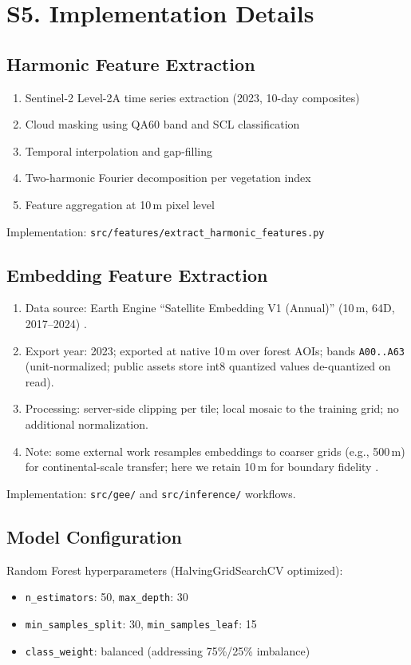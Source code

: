 \documentclass[utf8]{frontiers_suppmat}
\begin{document}
\section{S5. Implementation Details}

\subsection{Harmonic Feature Extraction}
\begin{enumerate}
    \item Sentinel-2 Level-2A time series extraction (2023, 10-day composites)
    \item Cloud masking using QA60 band and SCL classification
    \item Temporal interpolation and gap-filling
    \item Two-harmonic Fourier decomposition per vegetation index
    \item Feature aggregation at 10\,m pixel level
\end{enumerate}
Implementation: \texttt{src/features/extract\_harmonic\_features.py}

\subsection{Embedding Feature Extraction}
\begin{enumerate}
  \item Data source: Earth Engine “Satellite Embedding V1 (Annual)” (10\,m, 64D, 2017–2024) \citep{Google2025SatelliteEmbeddingV1}.
  \item Export year: 2023; exported at native 10\,m over forest AOIs; bands \texttt{A00..A63} (unit-normalized; public assets store int8 quantized values de-quantized on read).
  \item Processing: server-side clipping per tile; local mosaic to the training grid; no additional normalization.
  \item Note: some external work resamples embeddings to coarser grids (e.g., 500\,m) for continental-scale transfer; here we retain 10\,m for boundary fidelity \citep{Houriez2025AEFDataGen}.
\end{enumerate}
Implementation: \texttt{src/gee/} and \texttt{src/inference/} workflows.

\subsection{Model Configuration}
Random Forest hyperparameters (HalvingGridSearchCV optimized):
\begin{itemize}
    \item \texttt{n\_estimators}: 50, \texttt{max\_depth}: 30
    \item \texttt{min\_samples\_split}: 30, \texttt{min\_samples\_leaf}: 15
    \item \texttt{class\_weight}: balanced (addressing 75\%/25\% imbalance)
\end{itemize}
\end{document}
